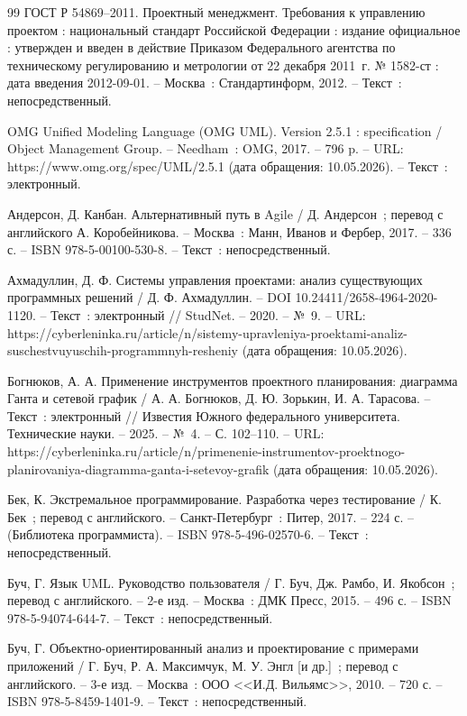 \begin{thebibliography}{99}
	 ГОСТ Р 54869--2011. Проектный менеджмент. Требования к управлению проектом : национальный стандарт Российской Федерации : издание официальное : утвержден и введен в действие Приказом Федерального агентства по техническому регулированию и метрологии от 22 декабря 2011~г. № 1582-ст : дата введения 2012-09-01. -- Москва~: Стандартинформ, 2012. -- Текст~: непосредственный.

	 OMG Unified Modeling Language (OMG UML). Version 2.5.1 : specification / Object Management Group. -- Needham~: OMG, 2017. -- 796 p. -- URL: https://www.omg.org/spec/UML/2.5.1 (дата обращения: 10.05.2026). -- Текст~: электронный.

	 Андерсон, Д. Канбан. Альтернативный путь в Agile / Д. Андерсон~; перевод с английского А. Коробейникова. -- Москва~: Манн, Иванов и Фербер, 2017. -- 336 с. -- ISBN 978-5-00100-530-8. -- Текст~: непосредственный.

	 Ахмадуллин, Д. Ф. Системы управления проектами: анализ существующих программных решений / Д. Ф. Ахмадуллин. -- DOI 10.24411/2658-4964-2020-1120. -- Текст~: электронный // StudNet. -- 2020. -- №~9. -- URL: https://cyberleninka.ru/article/n/sistemy-upravleniya-proektami-analiz-suschestvuyuschih-programmnyh-resheniy (дата обращения: 10.05.2026).

	 Богнюков, А. А. Применение инструментов проектного планирования: диаграмма Ганта и сетевой график / А. А. Богнюков, Д. Ю. Зорькин, И. А. Тарасова. -- Текст~: электронный // Известия Южного федерального университета. Технические науки. -- 2025. -- №~4. -- С. 102--110. -- URL: https://cyberleninka.ru/article/n/primenenie-instrumentov-proektnogo-planirovaniya-diagramma-ganta-i-setevoy-grafik (дата обращения: 10.05.2026).

	 Бек, К. Экстремальное программирование. Разработка через тестирование / К. Бек~; перевод с английского. -- Санкт-Петербург~: Питер, 2017. -- 224 с. -- (Библиотека программиста). -- ISBN 978-5-496-02570-6. -- Текст~: непосредственный.

	 Буч, Г. Язык UML. Руководство пользователя / Г. Буч, Дж. Рамбо, И. Якобсон~; перевод с английского. -- 2-е изд. -- Москва~: ДМК Пресс, 2015. -- 496 с. -- ISBN 978-5-94074-644-7. -- Текст~: непосредственный.

	 Буч, Г. Объектно-ориентированный анализ и проектирование с примерами приложений / Г. Буч, Р. А. Максимчук, М. У. Энгл [и др.]~; перевод с английского. -- 3-е изд. -- Москва~: ООО <<И.Д. Вильямс>>, 2010. -- 720 с. -- ISBN 978-5-8459-1401-9. -- Текст~: непосредственный.


\end{thebibliography}
